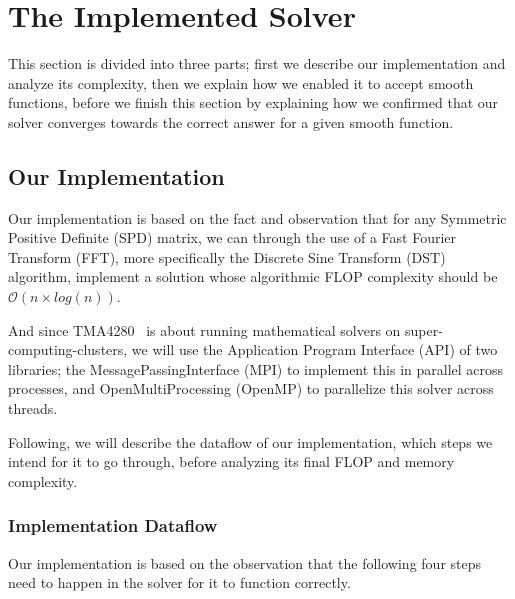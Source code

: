 \documentclass[fontsize=11pt,paper=a4,titlepage]{article}
\begin{document}
\section{The Implemented Solver}

This section is divided into three parts; first we describe our implementation
and analyze its complexity, then we explain how we enabled it to accept smooth
functions, before we finish this section by explaining how we confirmed that our
solver converges towards the correct answer for a given smooth function.

\subsection{Our Implementation}
\label{sec:Impl}

Our implementation is based on the fact and observation that for any Symmetric
Positive Definite (SPD) matrix, we can through the use of a Fast Fourier
Transform (FFT), more specifically the Discrete Sine Transform (DST)
algorithm, implement a solution whose algorithmic FLOP complexity should be
$\mathcal{O}(n\times log(n))$.

And since TMA4280~\cite{tma4280} is about running mathematical solvers on
super-computing-clusters, we will use the Application Program Interface (API)
of two libraries; the MessagePassingInterface (MPI) to implement this in
parallel across processes, and OpenMultiProcessing (OpenMP) to parallelize this
solver across threads.

Following, we will describe the dataflow of our implementation, which steps we
intend for it to go through, before analyzing its final FLOP and memory
complexity.

\subsubsection{Implementation Dataflow}
\label{ssec:dataflow}

Our implementation is based on the observation that the following four steps
need to happen in the solver for it to function correctly.
\end{document}
